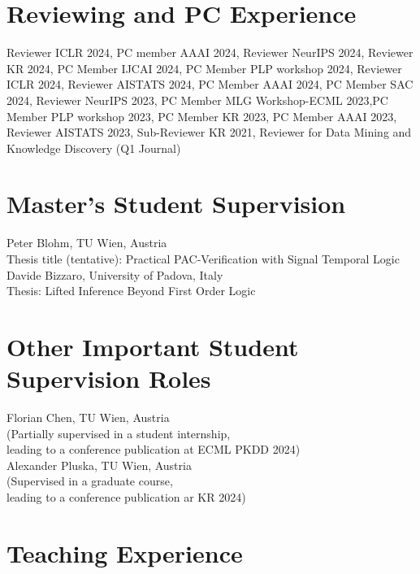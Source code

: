 \documentclass[10pt, a4paper]{article}
\newcommand{\years}[1]{\marginnote{\scriptsize #1}}
\begin{document}



\section*{Reviewing and PC Experience}
Reviewer ICLR 2024, PC member AAAI 2024, Reviewer NeurIPS 2024, Reviewer KR 2024, PC Member IJCAI 2024, PC Member PLP workshop 2024, Reviewer ICLR 2024, Reviewer AISTATS 2024, PC Member AAAI 2024, PC Member SAC 2024, Reviewer NeurIPS 2023, PC Member MLG Workshop-ECML 2023,PC Member PLP workshop 2023, PC Member  KR 2023, PC Member  AAAI 2023, Reviewer  AISTATS 2023, Sub-Reviewer  KR 2021, Reviewer for  Data Mining and Knowledge Discovery (Q1 Journal)


\section*{Master's Student Supervision}
\years{2024} Peter Blohm,  TU Wien, Austria\\
Thesis title (tentative): Practical PAC-Verification with Signal Temporal Logic \\ 

\years{2023} Davide Bizzaro,  University of Padova, Italy\\
Thesis: Lifted Inference Beyond First Order Logic 

\section*{Other Important Student Supervision Roles}
    \years{2024} Florian Chen, TU Wien, Austria\\
    (Partially supervised in a student internship,\\ leading to a conference publication at ECML PKDD 2024)\\

    \years{2024} Alexander Pluska,  TU Wien, Austria\\ 
    (Supervised in a graduate course,\\ leading to a conference publication ar KR 2024)\\

\section*{Teaching Experience}
\end{document}
